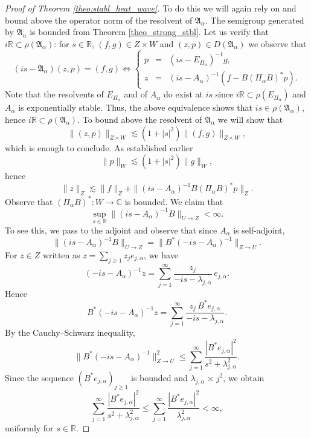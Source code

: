 \documentclass[10pt]{article}
\begin{document}
\begin{proof}[Proof of Theorem \ref{theo:stabl_heat_wave}]
\newline
To do this we will again rely on \cite{borichev_tomilov} and bound above the operator norm of the resolvent of $\mathfrak{A}_\alpha$. The semigroup generated by $\mathfrak{A}_\alpha$ is bounded from Theorem \ref{theo_strong_stbl}. Let us verify that $i \mathbb{R} \subset \rho(\mathfrak{A}_\alpha)$: for $s \in \mathbb{R}$, $(f,g) \in Z \times W$ and $(z,p) \in D(\mathfrak{A}_\alpha)$ we observe that 
\[
(is - \mathfrak{A}_\alpha)(z,p) = (f,g) \Longleftrightarrow \left\lbrace \begin{array}{rcl}
    p & = & (is-E_{\Pi_\alpha})^{-1}g,  \\
    z & = &  (is-A_\alpha)^{-1}(f-B(\Pi_\alpha B)^*p).
\end{array}\right.
\]
Note that the resolvents of $E_{\Pi_\alpha}$ and of $A_\alpha$ do exist at $is$ since $i \mathbb{R} \subset \rho(E_{\Pi_\alpha})$ and $A_\alpha$ is exponentially stable. Thus, the above equivalence shows that $is \in \rho(\mathfrak{A}_\alpha)$, hence $i \mathbb{R} \subset \rho(\mathfrak{A}_\alpha)$. To bound above the resolvent of $\mathfrak{A}_\alpha$ we will show that 
\[
\|(z,p)\|_{Z \times W} \lesssim (1+|s|^2) \|(f,g)\|_{Z \times W},
\]
which is enough to conclude. As established earlier 
\[
\|p \|_W \lesssim (1+|s|^2) \|g\|_W,
\]
hence 
\[
\|z\|_Z \lesssim \|f\|_Z + \|(is-A_\alpha)^{-1}B(\Pi_\alpha B)^*p\|_Z.
\]
Observe that $(\Pi_\alpha B)^* : W \rightarrow \mathbb{C}$ is bounded. We claim that
\[
\sup_{s \in \mathbb{R}} \|(is-A_\alpha)^{-1}B\|_{U \to Z} < \infty.
\]
To see this, we pass to the adjoint and observe that since $A_\alpha$ is self-adjoint,
\[
\|(is-A_\alpha)^{-1}B\|_{U \to Z}
=
\|B^*(-is-A_\alpha)^{-1}\|_{Z \to U}.
\]
For $z \in Z$ written as $z = \sum_{j \ge 1} z_j e_{j,\alpha}$, we have
\[
(-is-A_\alpha)^{-1}z
=
\sum_{j=1}^\infty \frac{z_j}{-is-\lambda_{j,\alpha}}\, e_{j,\alpha}.
\]
Hence
\[
B^*(-is-A_\alpha)^{-1}z
=
\sum_{j=1}^\infty \frac{z_j\, B^*e_{j,\alpha}}{-is-\lambda_{j,\alpha}}.
\]
By the Cauchy--Schwarz inequality,
\[
\|B^*(-is-A_\alpha)^{-1}\|_{Z \to U}^2
\le
\sum_{j=1}^\infty
\frac{|B^*e_{j,\alpha}|^2}{s^2+\lambda_{j,\alpha}^2}.
\]
Since the sequence $(B^*e_{j,\alpha})_{j\ge1}$ is bounded and
$\lambda_{j,\alpha} \asymp j^2$, we obtain
\[
\sum_{j=1}^\infty
\frac{|B^*e_{j,\alpha}|^2}{s^2+\lambda_{j,\alpha}^2}
\leqslant\sum_{j=1}^\infty\frac{|B^*e_{j,\alpha}|^2}{\lambda_{j,\alpha}^2}
< \infty,
\]
uniformly for $s \in \mathbb{R}$. 


\end{proof}
\end{document}
